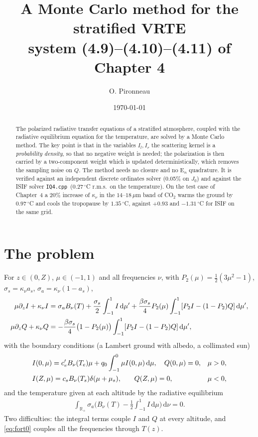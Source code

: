 \documentclass[11pt,a4paper]{article}
\title{\bf A Monte Carlo method for the stratified VRTE\\[2pt]
\large system (4.9)--(4.10)--(4.11) of Chapter 4}
\author{O. Pironneau}
\date{\today}
\renewcommand{\d}{\,\mathrm{d}}
\newcommand{\E}{\mathrm{E}}
\newcommand{\ISIF}{\texttt{IQ4.cpp}}
\begin{document}
\maketitle

\begin{abstract}\noindent
The polarized radiative transfer equations of a stratified atmosphere, coupled with the
radiative equilibrium equation for the temperature, are solved by a Monte Carlo method.
The key point is that in the variables $I_l,I_r$ the scattering kernel is a
\emph{probability density}, so that no negative weight is needed; the polarization is
then carried by a two-component weight which is updated deterministically, which removes
the sampling noise on $Q$. The method needs no closure and no $\E_n$ quadrature. It is
verified against an independent discrete ordinates solver (0.05\% on $J_0$) and against
the ISIF solver \ISIF\ ($0.27\,^\circ$C r.m.s.\ on the temperature). On the test case of
Chapter~4 a 20\% increase of $\kappa_\nu$ in the $14$--$18\,\mu$m band of CO$_2$ warms the
ground by $0.97\,^\circ$C and cools the tropopause by $1.35\,^\circ$C, against $+0.93$ and
$-1.31\,^\circ$C for ISIF on the same grid.
\end{abstract}

\section{The problem}
For $z\in(0,Z)$, $\mu\in(-1,1)$ and all frequencies $\nu$, with
$P_2(\mu)=\frac12(3\mu^2-1)$, $\sigma_s=\kappa_\nu a_s$, $\sigma_a=\kappa_\nu(1-a_s)$,
\begin{align}\label{eq:lq0}
\mu\partial_z I+\kappa_\nu I&=\sigma_aB_\nu(T)+\frac{\sigma_s}2\int_{-1}^1 I\d\mu'
+\frac{\beta\sigma_s}4P_2(\mu)\int_{-1}^1[P_2I-(1-P_2)Q]\d\mu',\notag\\
\mu\partial_z Q+\kappa_\nu Q&=-\frac{\beta\sigma_s}4\big(1-P_2(\mu)\big)\int_{-1}^1[P_2I-(1-P_2)Q]\d\mu',
\end{align}
with the boundary conditions (a Lambert ground with albedo, a collimated sun)
\begin{align}\label{eq:bc0}
&I(0,\mu)=c'_eB_\nu(T_e)\mu+q_0\int_{-1}^0\mu I(0,\mu)\d\mu,\quad Q(0,\mu)=0,&&\mu>0,\notag\\
&I(Z,\mu)=c_sB_\nu(T_s)\delta(\mu+\mu_s),\quad\ \ \, Q(Z,\mu)=0,&&\mu<0,
\end{align}
and the temperature given at each altitude by the radiative equilibrium
\begin{align}\label{eq:fort0}
\int_{\mathbb{R}_+}\sigma_a\Big(B_\nu(T)-\tfrac12\int_{-1}^1I\d\mu\Big)\d\nu=0 .
\end{align}
Two difficulties: the integral terms couple $I$ and $Q$ at every altitude, and
\eqref{eq:fort0} couples all the frequencies through $T(z)$.
\end{document}
